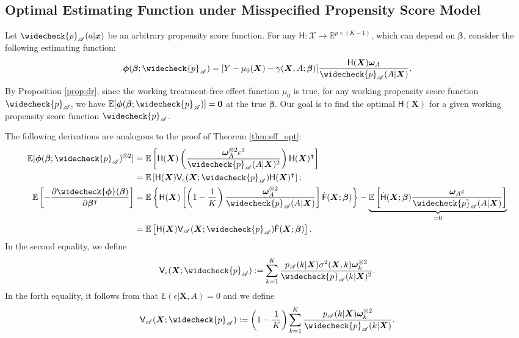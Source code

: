 \documentclass[11pt]{article}
\numberwithin{equation}{section}
\theoremstyle{definition}
\theoremstyle{remark}
\newcommand{\bx}{\bm{x}}
\newcommand{\bX}{\bm{X}}
\newcommand{\bbeta}{\bm{\beta}}
\newcommand{\bomega}{\bm{\omega}}
\newcommand{\bphi}{\bm{\phi}}
\newcommand{\bbE}{\mathbb{E}}
\newcommand{\bbR}{\mathbb{R}}
\newcommand{\cX}{\mathcal{X}}
\newcommand{\sA}{\mathscr{A}}
\newcommand{\sfF}{\mathsf{F}}
\newcommand{\sfH}{\mathsf{H}}
\newcommand{\sfV}{\mathsf{V}}
\newcommand{\bzero}{\mathbf{0}}	%
\begin{document}
\newpage

\subsection{Optimal Estimating Function under Misspecified Propensity Score Model}\label{sec:prop_mis}

Let $ \widecheck{p}_{\sA}(a|\bx) $ be an arbitrary propensity score function. For any $ \sfH: \cX \to \bbR^{p\times (K-1)} $, which can depend on $ \bbeta $, consider the following estimating function:
\[ \bphi(\bbeta;\widecheck{p}_{\sA}) = [Y - \mu_{0}(\bX) - \gamma(\bX,A;\bbeta)]{\sfH(\bX)\bomega_{A} \over \widecheck{p}_{\sA}(A|\bX)}. \]
By Proposition \ref{prop:dr}, since the working treatment-free effect function $ \mu_{0} $ is true, for any working propensity score function $ \widecheck{p}_{\sA} $, we have $ \bbE[\bphi(\bbeta;\widecheck{p}_{\sA})] = \bzero $ at the true $ \bbeta $. Our goal is to find the optimal $ \sfH(\bX) $ for a given working propensity score function $ \widecheck{p}_{\sA} $. 

The following derivations are analogous to the proof of Theorem \ref{thm:eff_opt}:
\begin{align*}
	\bbE[\bphi(\bbeta;\widecheck{p}_{\sA})^{\otimes 2}] &= \bbE\left[ \sfH(\bX)\left( {\bomega_{A}^{\otimes 2}\epsilon^{2} \over \widecheck{p}_{\sA}(A|\bX)^{2}} \right)\sfH(\bX)^{\intercal} \right]\\
	&= \bbE\left[ \sfH(\bX) \sfV_{\epsilon}(\bX;\widecheck{p}_{\sA}) \sfH(\bX)^{\intercal} \right];\\
	\bbE \left[-{\partial\widecheck{\bphi}(\bbeta) \over \partial \bbeta^{\intercal}}\right] &= \bbE\left\{ \sfH(\bX)\left[ \left( 1 - {1 \over K} \right){\bomega_{A}^{\otimes 2} \over \widecheck{p}_{\sA}(A|\bX)} \right]\dot{\sfF}(\bX;\bbeta) \right\} - \underbrace{\bbE\left[ \dot{\sfH}(\bX;\bbeta){\bomega_{A}\epsilon \over \widecheck{p}_{\sA}(A|\bX)} \right]}_{= 0}\\
	&= \bbE\left[ \sfH(\bX)\sfV_{\sA}(\bX;\widecheck{p}_{\sA})\dot{\sfF}(\bX;\bbeta) \right].
\end{align*}
In the second equality, we define
\[ \sfV_{\epsilon}(\bX;\widecheck{p}_{\sA}) := \sum_{k=1}^{K}{p_{\sA}(k|\bX)\sigma^{2}(\bX,k)\bomega_{k}^{\otimes 2} \over \widecheck{p}_{\sA}(k|\bX)^{2}}. \]
In the forth equality, it follows from that $ \bbE(\epsilon|\bX,A) = 0 $ and we define
\[ \sfV_{\sA}(\bX;\widecheck{p}_{\sA}) := \left( 1 - {1 \over K} \right)\sum_{k=1}^{K}{p_{\sA}(k|\bX)\bomega_{k}^{\otimes 2} \over \widecheck{p}_{\sA}(k|\bX)}. \]
\end{document}
